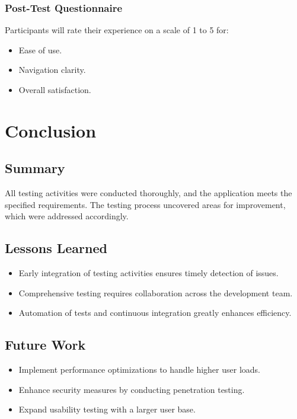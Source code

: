 \documentclass[12pt,a4paper]{report}
\begin{document}
\subsection{Post-Test Questionnaire}
Participants will rate their experience on a scale of 1 to 5 for:

\begin{itemize}
    \item Ease of use.
    \item Navigation clarity.
    \item Overall satisfaction.
\end{itemize}

\chapter{Conclusion}
\section{Summary}
All testing activities were conducted thoroughly, and the application meets the specified requirements. The testing process uncovered areas for improvement, which were addressed accordingly.

\section{Lessons Learned}
\begin{itemize}
    \item Early integration of testing activities ensures timely detection of issues.
    \item Comprehensive testing requires collaboration across the development team.
    \item Automation of tests and continuous integration greatly enhances efficiency.
\end{itemize}

\section{Future Work}
\begin{itemize}
    \item Implement performance optimizations to handle higher user loads.
    \item Enhance security measures by conducting penetration testing.
    \item Expand usability testing with a larger user base.
\end{itemize}
\end{document}
